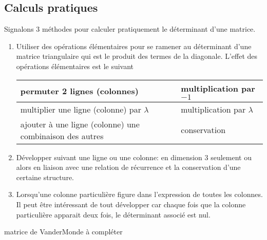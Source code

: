 \subsection{Calculs pratiques}
Signalons 3 méthodes pour calculer pratiquement le déterminant d'une matrice.
\begin{enumerate}
  \item Utiliser des opérations élémentaires pour se ramener au déterminant d'une matrice triangulaire qui est le produit des termes de la diagonale. L'effet des opérations élémentaires est le suivant
\begin{center}
\renewcommand{\arraystretch}{1.3}
\begin{tabular}{|l|l|} \hline 
permuter 2 lignes (colonnes)                             & multiplication par $-1$ \\ \hline
multiplier une ligne (colonne) par $\lambda$             & multiplication par $\lambda$ \\ \hline
ajouter à une ligne (colonne) une combinaison des autres & conservation \\ \hline
\end{tabular}
\end{center}
  \item Développer suivant une ligne ou une colonne: en dimension 3 seulement ou alors en liaison avec une relation de récurrence et la conservation d'une certaine structure.
  \item Lorsqu'une colonne particulière figure dans l'expression de toutes les colonnes. Il peut être intéressant de tout développer car chaque fois que la colonne particulière apparait deux fois, le déterminant associé est nul.
\end{enumerate}

 matrice de VanderMonde à compléter

